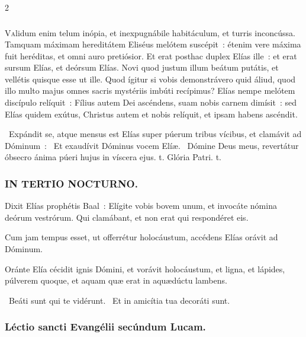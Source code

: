\documentclass[9pt,twoside]{extarticle}
\begin{document}
\begin{multicols}{2}
{\subsubsection*{\center {}}
\lettrine{V}alidum enim telum inópia, et inexpugnábile habitáculum, et turris inconcússa. Tamquam máximam hereditátem Eliséus melótem suscépit~: étenim vere máxima fuit heréditas, et omni auro pretiósior. Et erat posthac duplex Elías ille~: et erat sursum Elías, et deórsum Elías. Novi quod justum illum beátum putátis, et vellétis quisque esse ut ille. Quod ígitur si vobis demonstrávero quid áliud, quod illo multo majus omnes sacris mystériis imbúti recípimus? Elías nempe melótem discípulo relíquit~: Fílius autem Dei ascéndens, suam nobis carnem dimísit~: sed Elías quidem exútus, Christus autem et nobis relíquit, et ipsam habens ascéndit.

\begin{tightlist}{}
\item {}~Expándit se, atque mensus est Elías super púerum tribus vícibus, et clamávit ad Dóminum~: \textred{*}~Et exaudívit Dóminus vocem Elíæ. ~Dómine Deus meus, revertátur óbsecro ánima púeri hujus in víscera ejus. t. Glória Patri. t.
\end{tightlist}

\subsubsection*{\center \textsc{IN TERTIO NOCTURNO.}}
\begin{tightlist}{}
\item {} Dixit Elías prophétis Baal~: Elígite vobis bovem unum, et invocáte nómina deórum vestrórum. Qui clamábant, et non erat qui respondéret eis.
\item {} Cum jam tempus esset, ut offerrétur holocáustum, accédens Elías orávit ad Dóminum.
\item {} Oránte Elía cécidit ignis Dómini, et vorávit holocáustum, et ligna, et lápides, púlverem quoque, et aquam quæ erat in aquædúctu lambens.
\item {}~Beáti sunt qui te vidérunt. ~Et in amicítia tua decoráti sunt.
\end{tightlist}

\subsubsection*{\center Léctio sancti Evangélii secúndum Lucam.}
}
\end{multicols}
\end{document}
